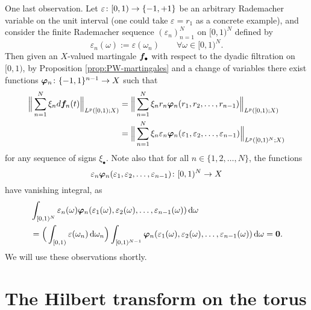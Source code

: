   One last observation.
  Let $\varepsilon \colon [0,1) \rightarrow \{-1,+1\}$ be an arbitrary Rademacher variable on the unit interval (one could take $\varepsilon = r_{1}$ as a concrete example), and consider the finite Rademacher sequence $(\varepsilon_{n})_{n = 1}^N$ on $[0,1)^{N}$ defined by
  \begin{equation*}
    \varepsilon_{n}(\omega) := \varepsilon(\omega_{n}) \qquad \forall \omega \in [0,1)^{N}.
  \end{equation*}
  Then given an $X$-valued martingale $\bm{f}_{\bullet}$ with respect to the dyadic filtration on $[0,1)$, by Proposition \ref{prop:PW-martingales} and a change of variables there exist functions $\bm{\varphi}_{n} \colon \{-1,1\}^{n-1} \to X$ such that
  \begin{equation*}
    \begin{aligned}
      \Big\| \sum_{n=1}^{N} \xi_{n}  d\bm{f}_{n}(t) \Big\|_{L^p([0,1);X)}
      &= \Big\| \sum_{n=1}^{N} \xi_{n} r_{n} \bm{\varphi}_{n}(r_{1}, r_{2}, \ldots, r_{n-1}) \Big\|_{L^p([0,1);X)} \\
      &= \Big\| \sum_{n=1}^{N} \xi_{n} \varepsilon_{n} \bm{\varphi}_{n}(\varepsilon_{1}, \varepsilon_{2}, \ldots, \varepsilon_{n-1}) \Big\|_{L^p([0,1)^{N};X)}
    \end{aligned}
  \end{equation*}
  for any sequence of signs $\xi_{\bullet}$.
  Note also that for all $n \in \{1,2,\ldots,N\}$, the functions
  \begin{equation*}
    \varepsilon_{n} \bm{\varphi}_{n}(\varepsilon_{1}, \varepsilon_{2}, \ldots, \varepsilon_{n-1}) \colon [0,1)^{N} \to X
  \end{equation*}
  have vanishing integral, as
  \begin{equation*}
    \begin{aligned}
      &\int_{[0,1)^{N}} \varepsilon_{n}(\omega) \bm{\varphi}_{n}(\varepsilon_{1}(\omega), \varepsilon_{2}(\omega), \ldots, \varepsilon_{n-1}(\omega)) \, \mathrm{d} \omega \\
    &= \Big( \int_{[0,1)} \varepsilon(\omega_{n}) \, \mathrm{d}\omega_{n} \Big) \int_{[0,1)^{N-1}} \bm{\varphi}_{n}(\varepsilon_{1}(\omega), \varepsilon_{2}(\omega), \ldots, \varepsilon_{n-1}(\omega)) \, \mathrm{d} \omega = \bm{0}.
  \end{aligned}
\end{equation*}
We will use these observations shortly.
  
  \section{The Hilbert transform on the torus}\label{sec:HT-torus}

